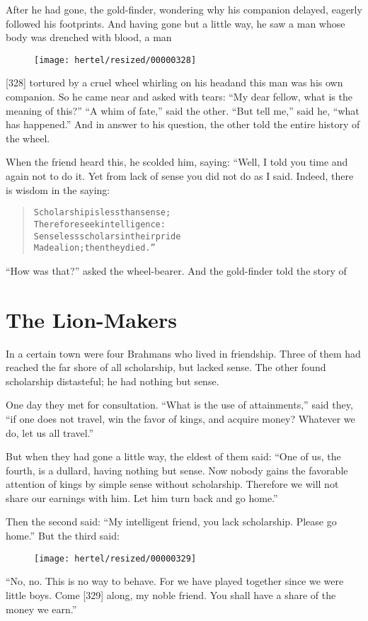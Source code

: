 \documentclass[article, twoside, 10pt]{memoir}
\renewenvironment{verbatim}{%
\begin{quote}%
\vskip -10pt%
\begin{alltt}\normalfont\small}{\end{alltt}%
\end{quote}%
\vskip -10pt
} %
\begin{document}
After he had gone, the gold-finder, wondering why his companion
delayed, eagerly followed his footprints. And having gone but a
little way, he saw a man whose body was drenched with blood, a man
\begin{figure}[p]\texttt{[image: hertel/resized/00000328]}\end{figure}[328] tortured by a cruel wheel whirling on his head{\textemdash}and this man
was his own companion. So he came near and asked with tears:
``My dear fellow, what is the meaning of this?''
``A whim of fate,'' said the other. ``But tell me,'' said he,
``what has happened.'' And in answer to his question, the other
told the entire history of the wheel.

When the friend heard this, he scolded him, saying: “Well, I told
you time and again not to do it. Yet from lack of sense you did not
do as I said. Indeed, there is wisdom in the saying:

\begin{verbatim}
Scholarship is less than sense;
Therefore seek intelligence:
Senseless scholars in their pride
Made a lion; then they died.”
\end{verbatim}
``How was that?'' asked the wheel-bearer. And the gold-finder told
the story of

\chapter{The Lion-Makers}

In a certain town were four Brahmans who lived in friendship. Three
of them had reached the far shore of all scholarship, but lacked
sense. The other found scholarship distasteful; he had nothing but
sense.

One day they met for consultation.
``What is the use of attainments,'' said they,
``if one does not travel, win the favor of kings, and acquire money? Whatever we do, let us all travel.''

But when they had gone a little way, the eldest of them said:
``One of us, the fourth, is a dullard, having nothing but sense. Now nobody gains the favorable attention of kings by simple sense without scholarship. Therefore we will not share our earnings with him. Let him turn back and go home.''

Then the second said:
``My intelligent friend, you lack scholarship. Please go home.''
But the third said:
\begin{figure}[p]\texttt{[image: hertel/resized/00000329]}\end{figure}``No, no. This is no way to behave. For we have played together since we were little boys. Come [329] along, my noble friend. You shall have a share of the money we earn.''
\end{document}

